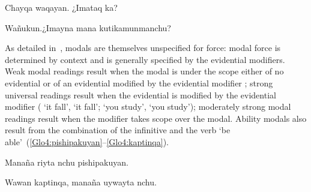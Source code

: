 %
{Chayqa waqayan. ¿Imataq ka?}%
{}%
{}{}%

%
{Wañukun.¿Imayna mana kutikamunmanchu?}%
{}%
{}{}%

\noindent
As detailed in~, \SYQ{} modals are themselves unspecified for force: modal force is determined by context and is generally specified by the evidential modifiers. Weak modal readings result when the modal is under the scope either of no evidential or of an evidential modified by the evidential modifier \uo; strong universal readings result when the evidential is modified by the evidential modifier  ( ‘it  fall’,  ‘it  fall’;  ‘you  study’,  ‘you  study’); moderately strong modal readings result when the modifier  takes scope over the modal. Ability modals also result from the combination of the infinitive and the verb  ‘be able’~(\ref{Glo4:pishipakuyan}--\ref{Glo4:kaptinqa}).

%
{Manaña riyta nchu pishipakuyan.}%
{}%
{}{}%

%
{Wawan kaptinqa, manaña uywayta nchu.}%
{}%
{}{}%

